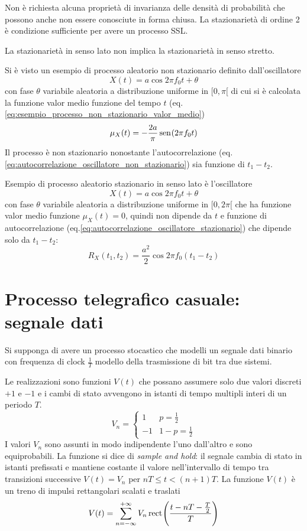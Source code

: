 Non è richiesta alcuna proprietà di invarianza delle densità di probabilità che possono anche non essere conosciute in forma chiusa.
La stazionarietà di ordine 2 è condizione sufficiente per avere un processo SSL.

La stazionarietà in senso lato non implica la stazionarietà in senso stretto.

\begin{esempio}
Si è visto un esempio di processo aleatorio non stazionario definito dall'oscillatore
\[X(t)=a\cos{2\pi f_0 t+\theta}\]
con fase $\theta$ variabile aleatoria a distribuzione uniforme in $[0,\pi[$
di cui si è calcolata la funzione valor medio funzione del tempo $t$ (eq.\ref{eq:esempio_processo_non_stazionario_valor_medio})
\[\mu_X(t)=-\frac{2a}{\pi}\,{\operatorname{sen}}^{}\!\left({2\pi f_0 t}\right)\]
Il processo è non stazionario nonostante l'autocorrelazione (eq.\ref{eq:autocorrelazione_oscillatore_non_stazionario}) sia funzione di $t_1-t_2$.
\end{esempio}

\begin{esempio}\label{es:oscillatore_stazionario_senso_lato}
Esempio di processo aleatorio stazionario in senso lato è l'oscillatore
\[X(t)=a\cos{2\pi f_0 t+\theta}\]
con fase $\theta$ variabile aleatoria a distribuzione uniforme in $[0,2\pi[$
che ha funzione valor medio funzione $\mu_X(t)=0$, quindi non dipende da $t$ e funzione di autocorrelazione (eq.\ref{eq:autocorrelazione_oscillatore_stazionario}) che dipende solo da $t_1-t_2$:
\[R_X(t_1,t_2)=\frac{a^2}{2}\cos{2\pi f_0(t_1-t_2)}\]
\end{esempio}

\section{Processo telegrafico casuale: segnale dati}
Si supponga di avere un processo stocastico che modelli un segnale dati binario con frequenza di clock $\frac{1}{T}$ modello della trasmissione di bit tra due sistemi.

Le realizzazioni sono funzioni $V(t)$ che possano assumere solo due valori discreti $+1$ e $-1$ e i cambi di stato avvengono in istanti di tempo multipli interi di un periodo $T$.
\begin{equation}V_n=\begin{cases}
1&p=\frac{1}{2}\\-1&1-p=\frac{1}{2}
\end{cases}\end{equation}
I valori $V_n$ sono assunti in modo indipendente l'uno dall'altro e sono equiprobabili. La funzione si dice di \emph{sample and hold}: il segnale cambia di stato in istanti prefissati e mantiene costante il valore nell'intervallo di tempo tra transizioni successive $V(t)=V_n$ per $n T\leq t<(n+1)T$.
La funzione $V(t)$ è un treno di impulsi rettangolari scalati e traslati
\begin{equation}\label{eq:segnale_dati}
V(t)=\sum_{n=-\infty}^{+\infty}{V_n\,{\operatorname{rect}}^{}\!\left({\frac{t-n T-\frac{T}{2}}{T}}\right)}
\end{equation}

